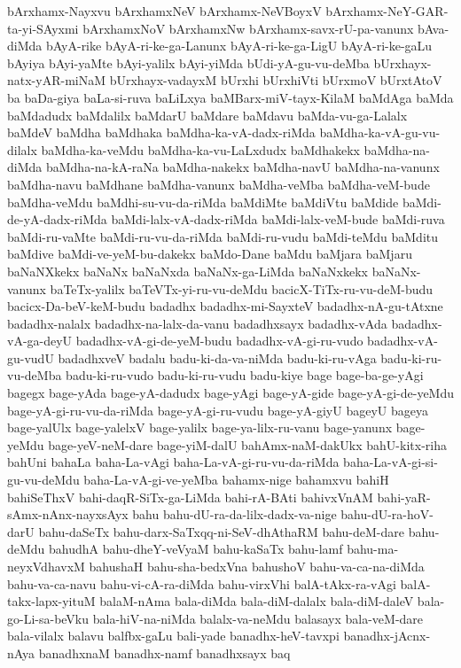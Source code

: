 {bArxhamx-Nayxvu
bArxhamxNeV
bArxhamx-NeVBoyxV
bArxhamx-NeY-GAR-ta-yi-SAyxmi
bArxhamxNoV
bArxhamxNw
bArxhamx-savx-rU-pa-vanunx
bAva-diMda
bAyA-rike
bAyA-ri-ke-ga-Lanunx
bAyA-ri-ke-ga-LigU
bAyA-ri-ke-gaLu
bAyiya
bAyi-yaMte
bAyi-yalilx
bAyi-yiMda
bUdi-yA-gu-vu-deMba
bUrxhayx-natx-yAR-miNaM
bUrxhayx-vadayxM
bUrxhi
bUrxhiVti
bUrxmoV
bUrxtAtoV
ba
baDa-giya
baLa-si-ruva
baLiLxya
baMBarx-miV-tayx-KilaM
baMdAga
baMda
baMdadudx
baMdalilx
baMdarU
baMdare
baMdavu
baMda-vu-ga-Lalalx
baMdeV
baMdha
baMdhaka
baMdha-ka-vA-dadx-riMda
baMdha-ka-vA-gu-vu-dilalx
baMdha-ka-veMdu
baMdha-ka-vu-LaLxdudx
baMdhakekx
baMdha-na-diMda
baMdha-na-kA-raNa
baMdha-nakekx
baMdha-navU
baMdha-na-vanunx
baMdha-navu
baMdhane
baMdha-vanunx
baMdha-veMba
baMdha-veM-bude
baMdha-veMdu
baMdhi-su-vu-da-riMda
baMdiMte
baMdiVtu
baMdide
baMdi-de-yA-dadx-riMda
baMdi-lalx-vA-dadx-riMda
baMdi-lalx-veM-bude
baMdi-ruva
baMdi-ru-vaMte
baMdi-ru-vu-da-riMda
baMdi-ru-vudu
baMdi-teMdu
baMditu
baMdive
baMdi-ve-yeM-bu-dakekx
baMdo-Dane
baMdu
baMjara
baMjaru
baNaNXkekx
baNaNx
baNaNxda
baNaNx-ga-LiMda
baNaNxkekx
baNaNx-vanunx
baTeTx-yalilx
baTeVTx-yi-ru-vu-deMdu
bacicX-TiTx-ru-vu-deM-budu
bacicx-Da-beV-keM-budu
badadhx
badadhx-mi-SayxteV
badadhx-nA-gu-tAtxne
badadhx-nalalx
badadhx-na-lalx-da-vanu
badadhxsayx
badadhx-vAda
badadhx-vA-ga-deyU
badadhx-vA-gi-de-yeM-budu
badadhx-vA-gi-ru-vudo
badadhx-vA-gu-vudU
badadhxveV
badalu
badu-ki-da-va-niMda
badu-ki-ru-vAga
badu-ki-ru-vu-deMba
badu-ki-ru-vudo
badu-ki-ru-vudu
badu-kiye
bage
bage-ba-ge-yAgi
bagegx
bage-yAda
bage-yA-dadudx
bage-yAgi
bage-yA-gide
bage-yA-gi-de-yeMdu
bage-yA-gi-ru-vu-da-riMda
bage-yA-gi-ru-vudu
bage-yA-giyU
bageyU
bageya
bage-yalUlx
bage-yalelxV
bage-yalilx
bage-ya-lilx-ru-vanu
bage-yanunx
bage-yeMdu
bage-yeV-neM-dare
bage-yiM-dalU
bahAmx-naM-dakUkx
bahU-kitx-riha
bahUni
bahaLa
baha-La-vAgi
baha-La-vA-gi-ru-vu-da-riMda
baha-La-vA-gi-si-gu-vu-deMdu
baha-La-vA-gi-ve-yeMba
bahamx-nige
bahamxvu
bahiH
bahiSeThxV
bahi-daqR-SiTx-ga-LiMda
bahi-rA-BAti
bahivxVnAM
bahi-yaR-sAmx-nAnx-nayxsAyx
bahu
bahu-dU-ra-da-lilx-dadx-va-nige
bahu-dU-ra-hoV-darU
bahu-daSeTx
bahu-darx-SaTxqq-ni-SeV-dhAthaRM
bahu-deM-dare
bahu-deMdu
bahudhA
bahu-dheY-veVyaM
bahu-kaSaTx
bahu-lamf
bahu-ma-neyxVdhavxM
bahushaH
bahu-sha-bedxVna
bahushoV
bahu-va-ca-na-diMda
bahu-va-ca-navu
bahu-vi-cA-ra-diMda
bahu-virxVhi
balA-tAkx-ra-vAgi
balA-takx-lapx-yituM
balaM-nAma
bala-diMda
bala-diM-dalalx
bala-diM-daleV
bala-go-Li-sa-beVku
bala-hiV-na-niMda
balalx-va-neMdu
balasayx
bala-veM-dare
bala-vilalx
balavu
balfbx-gaLu
bali-yade
banadhx-heV-tavxpi
banadhx-jAcnx-nAya
banadhxnaM
banadhx-namf
banadhxsayx
baq
}

